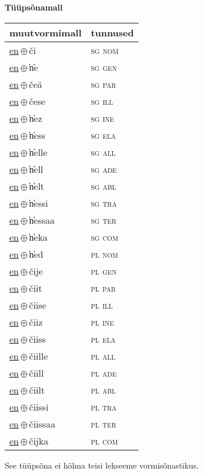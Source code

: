 

\vspace{3.5em}
\noindent \begin{minipage}{\textwidth}
\noindent \textbf{Tüüpsõnamall \,}\\

\begin{sideways}
\begin{tabular}{l l}
muutvormimall & tunnused \\
\hline
\underline{en}\,$\oplus$\,či & \textsc{ sg nom } \\
\underline{en}\,$\oplus$\,̕n̕e & \textsc{ sg gen } \\
\underline{en}\,$\oplus$\,čeä & \textsc{ sg par } \\
\underline{en}\,$\oplus$\,čese & \textsc{ sg ill } \\
\underline{en}\,$\oplus$\,̕n̕ez & \textsc{ sg ine } \\
\underline{en}\,$\oplus$\,̕n̕ess & \textsc{ sg ela } \\
\underline{en}\,$\oplus$\,̕n̕elle & \textsc{ sg all } \\
\underline{en}\,$\oplus$\,̕n̕ell & \textsc{ sg ade } \\
\underline{en}\,$\oplus$\,̕n̕elt & \textsc{ sg abl } \\
\underline{en}\,$\oplus$\,̕n̕essi & \textsc{ sg tra } \\
\underline{en}\,$\oplus$\,̕n̕essaa & \textsc{ sg ter } \\
\underline{en}\,$\oplus$\,̕n̕eka & \textsc{ sg com } \\
\underline{en}\,$\oplus$\,̕n̕ed & \textsc{ pl nom } \\
\underline{en}\,$\oplus$\,čije & \textsc{ pl gen } \\
\underline{en}\,$\oplus$\,čiit & \textsc{ pl par } \\
\underline{en}\,$\oplus$\,čiise & \textsc{ pl ill } \\
\underline{en}\,$\oplus$\,čiiz & \textsc{ pl ine } \\
\underline{en}\,$\oplus$\,čiiss & \textsc{ pl ela } \\
\underline{en}\,$\oplus$\,čiille & \textsc{ pl all } \\
\underline{en}\,$\oplus$\,čiill & \textsc{ pl ade } \\
\underline{en}\,$\oplus$\,čiilt & \textsc{ pl abl } \\
\underline{en}\,$\oplus$\,čiissi & \textsc{ pl tra } \\
\underline{en}\,$\oplus$\,čiissaa & \textsc{ pl ter } \\
\underline{en}\,$\oplus$\,čijka & \textsc{ pl com } \\
\end{tabular}
\end{sideways}
\label{tab:tüüpsõnamall-enči}

\end{minipage}

 
\vspace{1em}
\noindent See tüüpsõna ei hõlma teisi lekseeme vormi\-sõnastikus.
